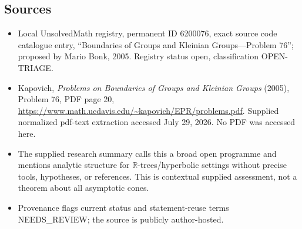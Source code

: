 \documentclass[11pt]{article}
\newcommand{\R}{\mathbb{R}}
\begin{document}
\subsection{Sources}
\begin{itemize}
\item Local UnsolvedMath registry, permanent ID 6200076, exact source code catalogue entry, ``Boundaries of Groups and Kleinian Groups---Problem 76''; proposed by Mario Bonk, 2005. Registry status open, classification OPEN-TRIAGE.
\item Kapovich, \emph{Problems on Boundaries of Groups and Kleinian Groups} (2005), Problem 76, PDF page 20, \url{https://www.math.ucdavis.edu/~kapovich/EPR/problems.pdf}. Supplied normalized pdf-text extraction accessed July 29, 2026. No PDF was accessed here.
\item The supplied research summary calls this a broad open programme and mentions analytic structure for $\R$-trees/hyperbolic settings without precise tools, hypotheses, or references. This is contextual supplied assessment, not a theorem about all asymptotic cones.
\item Provenance flags current status and statement-reuse terms NEEDS\_REVIEW; the source is publicly author-hosted.
\end{itemize}
\end{document}
